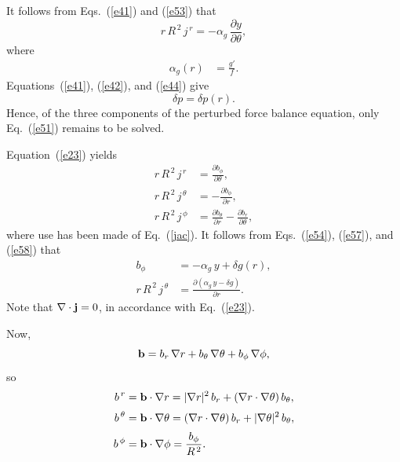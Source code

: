 \documentclass[12pt,prb,aps]{revtex4-1}
\begin{document}
It follows from Eqs.~(\ref{e41}) and (\ref{e53}) that 
\begin{equation}\label{e54}
r\,R^{\,2}\,j^{\,r} = -\alpha_g\,\frac{\partial y}{\partial\theta},
\end{equation}
where
\begin{align}
\alpha_g (r)&= \frac{g'}{f}.\label{ag}
\end{align}
Equations~(\ref{e41}), (\ref{e42}), and (\ref{e44}) give 
\begin{equation}\label{e54a}
\delta p = \delta p(r).
\end{equation}
Hence, of the three components of the perturbed force balance equation, only Eq.~(\ref{e51}) remains to be solved. 

Equation~(\ref{e23}) yields\,\cite{tj}
\begin{align}
r\,R^{\,2}\,j^{\,r} &= \frac{\partial b_\phi}{\partial\theta},\label{e57}\\[0.5ex]
r\,R^{\,2}\,j^{\,\theta} &= -\frac{\partial b_\phi}{\partial r},\label{e58}\\[0.5ex]
r\,R^{\,2}\,j^{\,\phi}&= \frac{\partial b_\theta}{\partial r} -\frac{\partial b_r}{\partial \theta},\label{e59}
\end{align}
where use has been made of Eq.~(\ref{jac}). It follows from Eqs.~(\ref{e54}), (\ref{e57}), and (\ref{e58}) that
\begin{align}\label{e43yy}
b_\phi &=-\alpha_g\,y +\delta g(r),\\[0.5ex]
r\,R^{\,2}\,j^{\,\theta}&=  \frac{\partial (\alpha_g\,y-\delta g)}{\partial r}.\label{e44yy}
\end{align}
Note that $\nabla\cdot{\bf j} = 0$, in accordance with Eq.~(\ref{e23}).

Now, 
\begin{equation}
{\bf b} = b_r\,\nabla r + b_\theta\,\nabla\theta+b_\phi\,\nabla\phi,
\end{equation}
so
\begin{align}
b^{\,r} &= {\bf b}\cdot\nabla r = |\nabla r|^2\,b_r + (\nabla r\cdot\nabla\theta)\,b_\theta,\label{e61}\\[0.5ex]
b^{\,\theta} &= {\bf b}\cdot\nabla \theta = (\nabla r\cdot\nabla\theta)\,b_r + |\nabla\theta|^2\,b_\theta,\label{e62}\\[0.5ex]
b^{\,\phi}&={\bf b}\cdot\nabla\phi =\frac{b_\phi}{R^{\,2}}.\label{e63}
\end{align}
\end{document}
